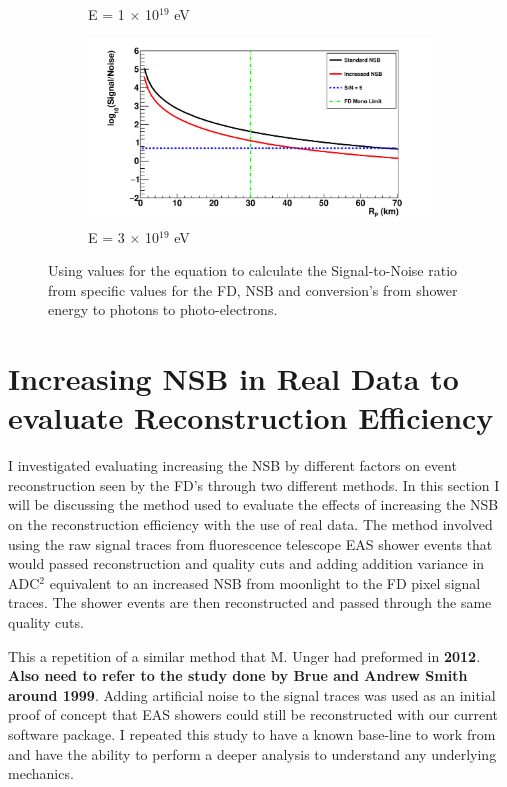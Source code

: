 \begin{figure}
\begin{subfigure}[b]{0.45\textwidth}
\caption{E = 1 $\times$ 10$^{19}$ eV}
\end{subfigure}
\hspace{3mm}
\begin{subfigure}[b]{0.45\textwidth}
\includegraphics[width=\textwidth]{chapters/graphs/SelectionEff/SignalToNoiseVsDistance_E3e19eV.pdf}
\caption{E = 3 $\times$ 10$^{19}$ eV}
\end{subfigure}
\caption{Using values for the equation to calculate the Signal-to-Noise ratio from specific values for the FD, NSB and conversion's from shower energy to photons to photo-electrons. }
\end{figure}

\section{Increasing NSB in Real Data to evaluate Reconstruction Efficiency}


I investigated evaluating increasing the NSB by different factors on event reconstruction seen by the FD's through two different methods. In this section I will be discussing the method used to evaluate the effects of increasing the NSB on the reconstruction efficiency with the use of real data. The method involved using the raw signal traces from fluorescence telescope EAS shower events that would passed reconstruction and quality cuts and adding addition variance in ADC$^2$ equivalent to an increased NSB from moonlight to the FD pixel signal traces.  The shower events are then reconstructed and passed through the same quality cuts. 

This a repetition of a similar method that M. Unger had preformed in \textbf{2012}. \textbf{Also need to refer to the study done by Brue and Andrew Smith around 1999}. Adding artificial noise to the signal traces was used as an initial proof of concept that EAS showers could still be reconstructed with our current software package. I repeated this study to have a known base-line to work from and have the ability to perform a deeper analysis to understand any underlying mechanics. 

